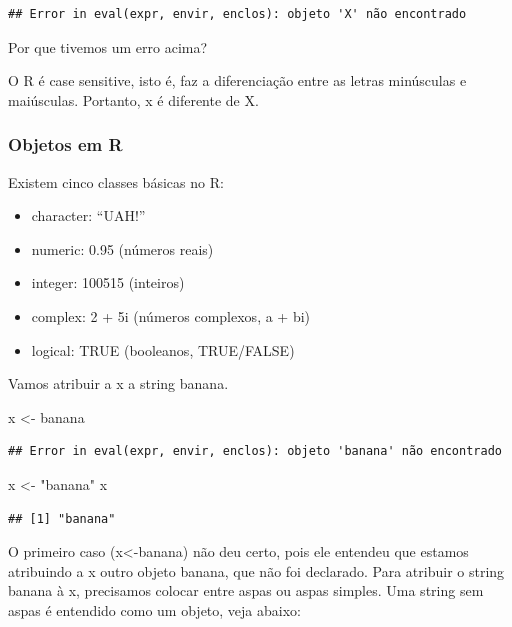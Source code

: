 \documentclass[
]{book}
\newenvironment{Shaded}{\begin{snugshade}}{\end{snugshade}}
\newcommand{\NormalTok}[1]{#1}
\newcommand{\StringTok}[1]{\textcolor[rgb]{0.31,0.60,0.02}{#1}}
\begin{document}
\begin{verbatim}
## Error in eval(expr, envir, enclos): objeto 'X' não encontrado
\end{verbatim}

Por que tivemos um erro acima?

O R é case sensitive, isto é, faz a diferenciação entre as letras minúsculas e maiúsculas. Portanto, x é diferente de X.

\hypertarget{objetos-em-r}{%
\subsubsection{Objetos em R}\label{objetos-em-r}}

Existem cinco classes básicas no R:

\begin{itemize}
\item
  character: ``UAH!''
\item
  numeric: 0.95 (números reais)
\item
  integer: 100515 (inteiros)
\item
  complex: 2 + 5i (números complexos, a + bi)
\item
  logical: TRUE (booleanos, TRUE/FALSE)
\end{itemize}

Vamos atribuir a x a string banana.

\begin{Shaded}
\begin{Highlighting}[]
\NormalTok{x <-}\StringTok{ }\NormalTok{banana }
\end{Highlighting}
\end{Shaded}

\begin{verbatim}
## Error in eval(expr, envir, enclos): objeto 'banana' não encontrado
\end{verbatim}

\begin{Shaded}
\begin{Highlighting}[]
\NormalTok{x <-}\StringTok{ "banana"}
\NormalTok{x}
\end{Highlighting}
\end{Shaded}

\begin{verbatim}
## [1] "banana"
\end{verbatim}

O primeiro caso (x\textless-banana) não deu certo, pois ele entendeu que estamos atribuindo a x outro objeto banana, que não foi declarado. Para atribuir o string banana à x, precisamos colocar entre aspas ou aspas simples. Uma string sem aspas é entendido como um objeto, veja abaixo:
\end{document}
